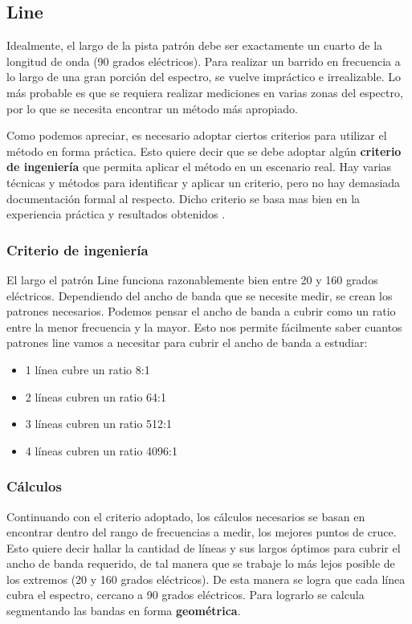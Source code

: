 \documentclass[10pt, a4paper, twocolumn]{article}
\begin{document}
\subsection{Line}

Idealmente, el largo de la pista patrón debe ser exactamente un cuarto de la longitud de onda (90 grados eléctricos). Para realizar un barrido en frecuencia a lo largo de una gran porción del espectro, se vuelve impráctico e irrealizable. Lo más probable es que se requiera realizar mediciones en varias zonas del espectro, por lo que se necesita encontrar un método más apropiado. \newline

Como podemos apreciar, es necesario adoptar ciertos criterios para utilizar el método en
forma práctica. Esto quiere decir que se debe adoptar algún \textbf{criterio de ingeniería}
que permita aplicar el método en un escenario real. Hay varias técnicas y métodos para identificar y aplicar un criterio, pero no hay demasiada documentación formal al respecto.
Dicho criterio se basa mas bien en la experiencia práctica y resultados obtenidos \cite{engcrit}.

\subsubsection{Criterio de ingeniería}

El largo el patrón Line funciona razonablemente bien entre 20 y 160 grados eléctricos. Dependiendo del ancho de banda que se necesite medir, se crean los patrones necesarios. Podemos pensar el ancho de banda a cubrir como un ratio entre la menor frecuencia y la mayor. Esto nos permite fácilmente saber cuantos patrones line vamos a necesitar
para cubrir el ancho de banda a estudiar:

\begin{itemize}
\item 1 línea cubre un ratio 8:1
\item 2 líneas cubren un ratio 64:1
\item 3 líneas cubren un ratio 512:1
\item 4 líneas cubren un ratio 4096:1
\end{itemize}

\subsubsection{Cálculos}

Continuando con el criterio adoptado, los cálculos necesarios se basan en encontrar
dentro del rango de frecuencias a medir, los mejores puntos de cruce. Esto quiere decir
hallar la cantidad de líneas y sus largos óptimos para cubrir el ancho de banda
requerido, de tal manera que se trabaje lo más lejos posible de los extremos (20 y 160 grados
eléctricos). De esta manera se logra que cada línea cubra el espectro, cercano a 90 grados
eléctricos. Para lograrlo se calcula segmentando las bandas en forma \textbf{geométrica}. \newline
\end{document}
